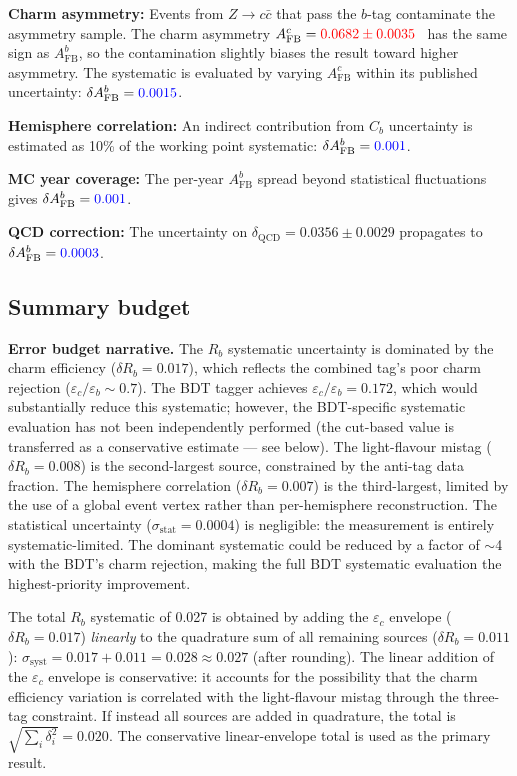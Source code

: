 \documentclass[11pt,a4paper]{article}
\newcommand{\measured}[1]{\textcolor{blue}{#1}}
\newcommand{\external}[1]{\textcolor{red}{#1}}
\begin{document}
\textbf{Charm asymmetry:}
Events from $Z \to c\bar{c}$ that pass the $b$-tag contaminate the
asymmetry sample.  The charm asymmetry
$A_\mathrm{FB}^c = \external{0.0682 \pm 0.0035}$~\cite{LEP:EWWG:2005}
has the same sign as $A_\mathrm{FB}^b$, so the contamination slightly
biases the result toward higher asymmetry.  The systematic is evaluated
by varying $A_\mathrm{FB}^c$ within its published uncertainty:
$\delta A_\mathrm{FB}^b = \measured{0.0015}$.

\textbf{Hemisphere correlation:}
An indirect contribution from $C_b$ uncertainty is estimated as 10\% of
the working point systematic:
$\delta A_\mathrm{FB}^b = \measured{0.001}$.

\textbf{MC year coverage:}
The per-year $A_\mathrm{FB}^b$ spread beyond statistical fluctuations
gives $\delta A_\mathrm{FB}^b = \measured{0.001}$.

\textbf{QCD correction:}
The uncertainty on $\delta_\mathrm{QCD} = 0.0356 \pm 0.0029$ propagates
to $\delta A_\mathrm{FB}^b = \measured{0.0003}$.

\subsection{Summary budget}

\textbf{Error budget narrative.}
The $R_b$ systematic uncertainty is dominated by the charm efficiency
($\delta R_b = 0.017$), which reflects the combined tag's poor charm
rejection ($\varepsilon_c/\varepsilon_b \sim 0.7$).  The BDT tagger
achieves $\varepsilon_c/\varepsilon_b = 0.172$, which would substantially
reduce this systematic; however, the BDT-specific systematic evaluation
has not been independently performed (the cut-based value is transferred
as a conservative estimate --- see below).  The light-flavour mistag
($\delta R_b = 0.008$) is the second-largest source, constrained by the
anti-tag data fraction.  The hemisphere correlation ($\delta R_b = 0.007$)
is the third-largest, limited by the use of a global event vertex rather
than per-hemisphere reconstruction.  The statistical uncertainty
($\sigma_\mathrm{stat} = 0.0004$) is negligible: the measurement is
entirely systematic-limited.  The dominant systematic could be reduced by
a factor of $\sim$4 with the BDT's charm rejection, making the full
BDT systematic evaluation the highest-priority improvement.

The total $R_b$ systematic of 0.027 is obtained by adding the
$\varepsilon_c$ envelope ($\delta R_b = 0.017$) \emph{linearly} to
the quadrature sum of all remaining sources ($\delta R_b = 0.011$):
$\sigma_\mathrm{syst} = 0.017 + 0.011 = 0.028 \approx 0.027$
(after rounding).  The linear addition of the $\varepsilon_c$ envelope
is conservative: it accounts for the possibility that the charm
efficiency variation is correlated with the light-flavour mistag
through the three-tag constraint.  If instead all sources are added in
quadrature, the total is $\sqrt{\sum_i \delta_i^2} = 0.020$.  The
conservative linear-envelope total is used as the primary result.
\end{document}
